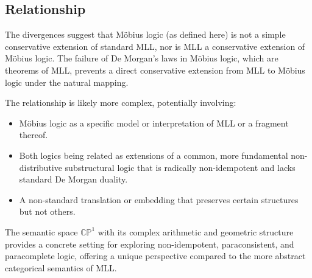 \documentclass{article}
\begin{document}
	\subsection{Relationship}
	The divergences suggest that M\"{o}bius logic (as defined here) is not a simple conservative extension of standard MLL, nor is MLL a conservative extension of M\"{o}bius logic. The failure of De Morgan's laws in M\"{o}bius logic, which are theorems of MLL, prevents a direct conservative extension from MLL to M\"{o}bius logic under the natural mapping.
	
	The relationship is likely more complex, potentially involving:
	\begin{itemize}
		\item M\"{o}bius logic as a specific model or interpretation of MLL or a fragment thereof.
		\item Both logics being related as extensions of a common, more fundamental non-distributive substructural logic that is radically non-idempotent and lacks standard De Morgan duality.
		\item A non-standard translation or embedding that preserves certain structures but not others.
	\end{itemize}
	The semantic space \(\mathbb{CP}^1\) with its complex arithmetic and geometric structure provides a concrete setting for exploring non-idempotent, paraconsistent, and paracomplete logic, offering a unique perspective compared to the more abstract categorical semantics of MLL.
	
\end{document}
